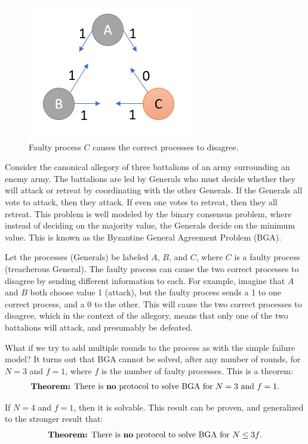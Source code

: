 \documentclass[twoside]{article}
\begin{document}
\begin{figure}
    \centering
    \includegraphics[scale=0.75]{images/Byz1}
    \caption{Faulty process $C$ causes the correct processes to disagree.}
    \label{fig:my_label}
\end{figure}

Consider the canonical allegory of three battalions of an army surrounding an enemy army. The battalions are led by Generals who must decide whether they will attack or retreat by coordinating with the other Generals. If the Generals all vote to attack, then they attack. If even one votes to retreat, then they all retreat. This problem is well modeled by the binary consensus problem, where instead of deciding on the majority value, the Generals decide on the minimum value. This is known as the Byzantine General Agreement Problem (BGA).

Let the processes (Generals) be labeled $A$, $B$, and $C$, where $C$ is a faulty process (treacherous General). The faulty process can cause the two correct processes to disagree by sending different information to each. For example, imagine that $A$ and $B$ both choose value 1 (attack), but the faulty process sends a 1 to one correct process, and a 0 to the other. This will cause the two correct processes to disagree, which in the context of the allegory, means that only one of the two battalions will attack, and presumably be defeated. 

What if we try to add multiple rounds to the process as with the simple failure model? It turns out that BGA cannot be solved, after any number of rounds, for $N=3$ and $f=1$, where $f$ is the number of faulty processes. This is a theorem:
\begin{align*}
    \text{\textbf{Theorem:} There is \textbf{no} protocol to solve BGA for $N=3$ and $f=1$}.
\end{align*}

\pagebreak
If $N=4$ and $f=1$, then it is solvable. This result can be proven, and generalized to the stronger result that:
\begin{align*}
    \text{\textbf{Theorem:} There is \textbf{no} protocol to solve BGA for $N \leq 3f$}.
\end{align*}
\end{document}
